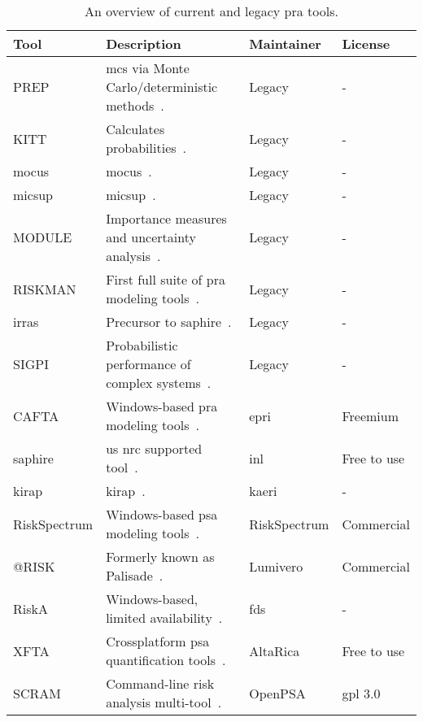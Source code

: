 \begin{table}[ht!]
\centering
\caption{An overview of current and legacy \acrlong{pra} tools.}
\label{tab:pra_tools_overview}
\begin{tabular}{@{}llll@{}}
\toprule
\textbf{Tool} &
  \textbf{Description} &
  \textbf{Maintainer} &
  \textbf{License} \\ \midrule

PREP &
  \acrshort{mcs} via Monte Carlo/deterministic methods~\cite{vesely_prep_1970}.&
  Legacy &
  - \\
KITT &
  Calculates probabilities~\cite{vesely_prep_1997}. &
  Legacy &
  - \\
\acrshort{mocus} &
  \acrlong{mocus}~\cite{Fussell1974MOCUS}. &
  Legacy &
  - \\
\acrshort{micsup} &
  \acrlong{micsup}~\cite{micsup}. &
  Legacy &
  - \\
MODULE &
  Importance measures and uncertainty analysis~\cite{module}. &
  Legacy &
  - \\
RISKMAN &
  First full suite of \acrshort{pra} modeling tools~\cite{riskman1,riskman2}. &
  Legacy &
  - \\
\acrshort{irras}  &
  Precursor to \acrshort{saphire}~\cite{irras1,irras2}. &
  Legacy &
  - \\
SIGPI &
  Probabilistic performance of complex systems~\cite{sigpi}. &
  Legacy &
  - \\
CAFTA &
  Windows-based \acrshort{pra} modeling tools~\cite{cafta1,cafta2}. &
  \acrshort{epri} &
  Freemium \\
\acrshort{saphire} &
  \acrshort{us} \acrshort{nrc} supported tool~\cite{saphire1,SAPHIRE,saphire_manual}. &
  \acrshort{inl} &
  Free to use \\
\acrshort{kirap} &
  \small{\acrlong{kirap}}~\cite{kirap}. &
  \acrshort{kaeri} &
  - \\
\small{RiskSpectrum} &
  Windows-based \acrshort{psa} modeling tools~\cite{riskspectrum1}. &
\small{RiskSpectrum} &
  Commercial \\
@RISK &
  Formerly known as Palisade~\cite{palisade1,palisade12}. &
  Lumivero &
  Commercial \\
RiskA &
  Windows-based, limited availability~\cite{riska1}. &
  \acrshort{fds} &
  - \\
XFTA &
  Crossplatform \acrshort{psa} quantification tools~\cite{xfta1}. &
  AltaRica &
  Free to use \\
SCRAM &
  Command-line risk analysis multi-tool~\cite{scram}. &
  OpenPSA &
  \acrshort{gpl} 3.0 \\

\end{tabular}
\end{table}
